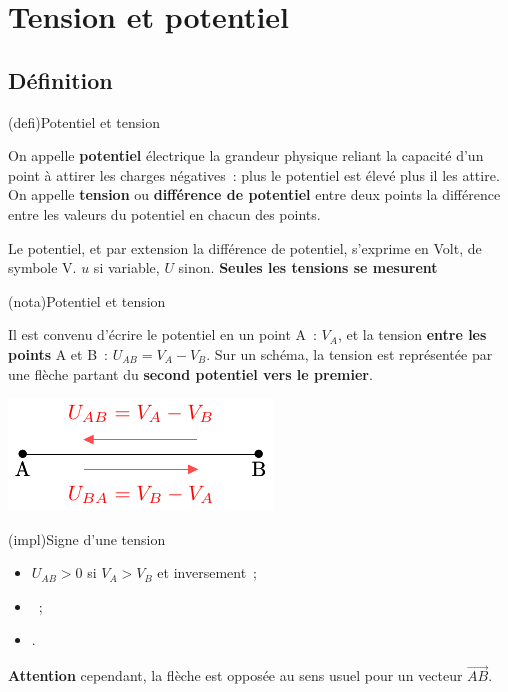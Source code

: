 \documentclass[../../main/main.tex]{subfiles}
\begin{document}
\section{Tension et potentiel}
\subsection{Définition}
\begin{tcb}[label=def:tension, sidebyside](defi){Potentiel et tension}

	On appelle \textbf{potentiel} électrique la grandeur physique reliant la
	capacité d'un point à attirer les charges négatives~: plus le potentiel
	est élevé plus il les attire. On appelle \textbf{tension} ou
	\textbf{différence de potentiel} entre deux points la différence entre
	les valeurs du potentiel en chacun des points.

	\tcblower
	Le potentiel, et par extension la différence de potentiel, s'exprime en
	Volt, de symbole V.
	$u$ si variable, $U$ sinon.
	\textbf{Seules les tensions se mesurent}
\end{tcb}
\begin{tcb}[label=nota:tension, sidebyside, righthand ratio=.4](nota){Potentiel et tension}

	Il est convenu d'écrire le potentiel en un point A~: $V_A$, et la
	tension \textbf{entre les points} A et B~: $U_{AB} = V_A - V_B$. Sur un
	schéma, la tension est représentée par une flèche partant du
	\textbf{second potentiel vers le premier}.

	\tcblower
	\begin{center}
		\includegraphics[width=\linewidth]{tensionconv}
	\end{center}
\end{tcb}
\begin{tcb}[label=impl:tension](impl){Signe d'une tension}

	\begin{itemize}
		\item $U_{AB} > 0$ si $V_A > V_B$ et inversement~;
		\item {}~;
		\item {}.
	\end{itemize}

	\textbf{Attention} cependant, la flèche est opposée au sens usuel pour
	un vecteur $\overrightarrow{AB}$.

\end{tcb}
\end{document}
